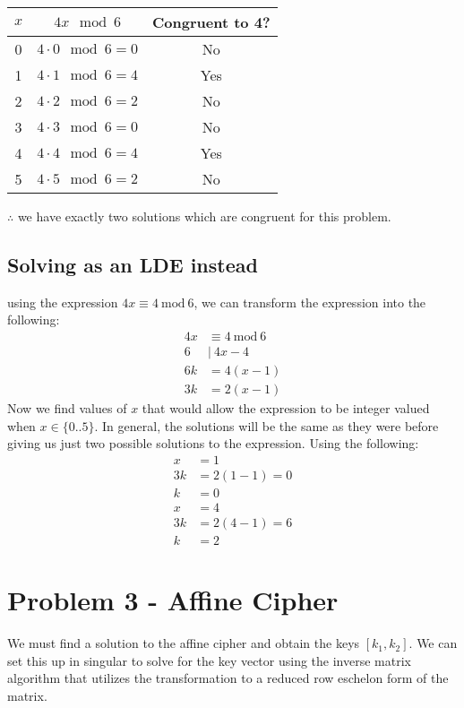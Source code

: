 \documentclass[11pt]{article}
\begin{document}
\begin{center}
\begin{tabular}{|c|c|c|}
\hline
\( x \) & \( 4x \mod 6 \) & Congruent to 4? \\
\hline
0 & \( 4 \cdot 0 \mod 6 = 0 \) & No \\
1 & \( 4 \cdot 1 \mod 6 = 4 \) & Yes \\
2 & \( 4 \cdot 2 \mod 6 = 2 \) & No \\
3 & \( 4 \cdot 3 \mod 6 = 0 \) & No \\
4 & \( 4 \cdot 4 \mod 6 = 4 \) & Yes \\
5 & \( 4 \cdot 5 \mod 6 = 2 \) & No \\
\hline
\end{tabular}
\end{center}
\(\therefore\) we have exactly two solutions which are congruent for this problem.

\subsection{Solving as an LDE instead}
\label{sec:org40c25ad}
using the expression \(4x \equiv 4\ \text{mod}\ 6\), we can transform the expression into the following:
\begin{align*}
4x &\equiv 4\ \text{mod}\ 6\\
6 &|\ 4x - 4\\
6k &= 4(x - 1)\\
3k &= 2(x - 1)
\end{align*}
Now we find values of $x$ that would allow the expression to be integer valued when $x \in \{0..5\}$. In general, the solutions will be the same as they were before giving us just two possible solutions to the expression. Using the following:
\begin{align*}
 x &= 1\\
 3k &= 2(1 - 1) = 0\\
 k &= 0 \\
 x &= 4\\
 3k &= 2(4 - 1) = 6\\
 k &= 2 
\end{align*}

\section{Problem 3 - Affine Cipher}
\label{sec:org756eb8c}
We must find a solution to the affine cipher and obtain the keys \([k_1, k_2]\). We can set this up in singular to solve for the key vector using the inverse matrix algorithm that utilizes the transformation to a reduced row eschelon form of the matrix.
\end{document}
